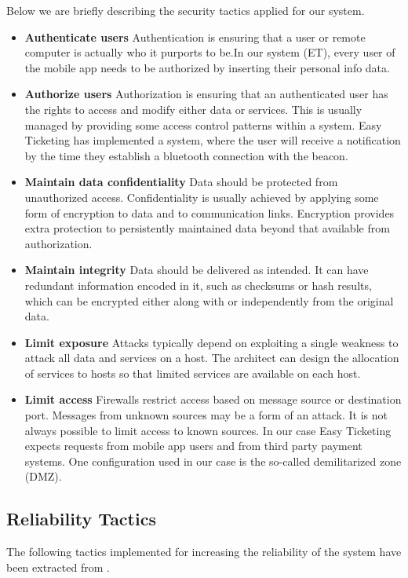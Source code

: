 Below we are briefly describing the security tactics applied for our system.
\begin{itemize} 

\item \textbf{Authenticate users}
Authentication is ensuring that a user or remote computer is actually who it purports to be.In our system (ET), every user of the mobile app needs to be authorized by inserting their personal info data. 

\item \textbf{Authorize users}
Authorization is ensuring that an authenticated user has the rights to access and modify either data or services. This is usually managed by providing some access control patterns within a system. Easy Ticketing has implemented a system, where the user will receive a notification by the time they establish a bluetooth connection with the beacon.

\item \textbf{Maintain data confidentiality} 
Data should be protected from unauthorized access. Confidentiality is usually achieved by applying some form of encryption to data and to communication links. Encryption provides extra protection to persistently maintained data beyond that available from authorization. 

\item \textbf{Maintain integrity} Data should be delivered as intended. It can have redundant information encoded in it, such as checksums or hash results, which can be encrypted either along with or independently from the original data.

\item \textbf{Limit exposure} Attacks typically depend on exploiting a single weakness to attack all data and services on a host. The architect can design the allocation of services to hosts so that limited services are available on each host.

\item \textbf{Limit access} Firewalls restrict access based on message source or destination port. Messages from unknown sources may be a form of an attack. It is not always possible to limit access to known sources. In our case Easy Ticketing  expects requests from mobile app users and from third party payment systems.  One configuration used in our case is the so-called demilitarized zone (DMZ). 
\end{itemize} 



\subsection{Reliability Tactics}
The following tactics implemented for increasing the reliability of the system have been extracted from \cite{tactics-reliability}.

